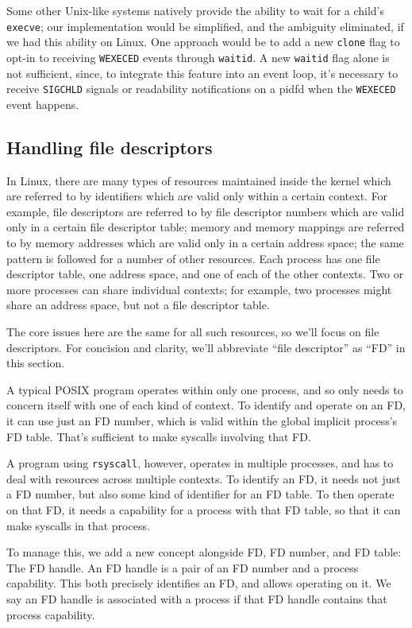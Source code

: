 \documentclass[letterpaper,twocolumn,10pt]{article}
\begin{document}
Some other Unix-like systems natively provide the ability to wait for a child's \texttt{execve}\cite{freebsd_kqueue};
our implementation would be simplified, and the ambiguity eliminated,
if we had this ability on Linux.
One approach would be to add a new \texttt{clone} flag to
opt-in to receiving \texttt{WEXECED} events through \texttt{waitid}.
A new \texttt{waitid} flag alone is not sufficient,
since, to integrate this feature into an event loop,
it's necessary to receive \texttt{SIGCHLD} signals or readability notifications on a pidfd
when the \texttt{WEXECED} event happens.
\subsection{Handling file descriptors}\label{fd_handles}
In Linux, there are many types of resources maintained inside the kernel
which are referred to by identifiers which are valid only within a certain context.
For example, file descriptors are referred to by file descriptor numbers
which are valid only in a certain file descriptor table;
memory and memory mappings are referred to by memory addresses
which are valid only in a certain address space;
the same pattern is followed for a number of other resources\cite{tlpi}.
Each process has one file descriptor table, one address space, and one of each of the other contexts.
Two or more processes can share individual contexts;
for example, two processes might share an address space, but not a file descriptor table.

The core issues here are the same for all such resources,
so we'll focus on file descriptors.
For concision and clarity, we'll abbreviate ``file descriptor'' as ``FD'' in this section.

A typical POSIX program operates within only one process,
and so only needs to concern itself with one of each kind of context.
To identify and operate on an FD, it can use just an FD number,
which is valid within the global implicit process's FD table.
That's sufficient to make syscalls involving that FD.

A program using \texttt{rsyscall}, however,
operates in multiple processes,
and has to deal with resources across multiple contexts.
To identify an FD,
it needs not just a FD number,
but also some kind of identifier for an FD table.
To then operate on that FD,
it needs a capability for a process with that FD table,
so that it can make syscalls in that process.

To manage this, we add a new concept alongside FD, FD number, and FD table:
The FD handle.
An FD handle is a pair of an FD number and a process capability.
This both precisely identifies an FD, and allows operating on it.
We say an FD handle is associated with a process
if that FD handle contains that process capability.
\end{document}
